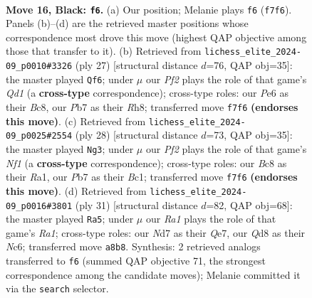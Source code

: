 \documentclass[11pt]{article}
\begin{document}
\clearpage

\begin{figure}[p]\centering
\begin{subfigure}{0.46\textwidth}\centering
\resizebox{\linewidth}{!}{%
\newchessgame
\chessboard[
  setfen={r1bq1rk1/1p1n1ppp/n1p1p3/p2pP3/3P1P2/2N2N2/PPP2KPP/2RQ1B1R b - - 7 16},
  showmover=false,
  pgfstyle=straightmove, color=movearrow, markmove={f7-f6}
]}
\caption{}
\end{subfigure}\hfill
\begin{subfigure}{0.46\textwidth}\centering
\resizebox{\linewidth}{!}{%
\newchessgame
\chessboard[
  setfen={r1bqk2r/pp1n1p2/3p2p1/2pPp2n/2P1P2p/2NN1P2/PP1Q2PP/1K1R1B1R b q - 5 14},
  showmover=false,
  pgfstyle=straightmove, color=movearrow, markmove={d8-f6}
]}
\caption{}
\end{subfigure}
\\[4pt]
\begin{subfigure}{0.46\textwidth}\centering
\resizebox{\linewidth}{!}{%
\newchessgame
\chessboard[
  setfen={1r1q1bk1/2p2pp1/p1nprn1p/1p2p3/P3P3/2PP1N1P/1P3PP1/R1BQRNK1 w - - 0 15},
  showmover=false,
  pgfstyle=straightmove, color=movearrow, markmove={f1-g3}
]}
\caption{}
\end{subfigure}\hfill
\begin{subfigure}{0.46\textwidth}\centering
\resizebox{\linewidth}{!}{%
\newchessgame
\chessboard[
  setfen={r1b2rk1/1p1nqpp1/2n1p2p/2P5/p2pN3/3P1NP1/PPQ2PBP/2R1R1K1 b - - 4 16},
  showmover=false,
  pgfstyle=straightmove, color=movearrow, markmove={a8-a5}
]}
\caption{}
\end{subfigure}
\caption{\textbf{Move 16, Black: \texttt{f6}.} (a) Our position; Melanie plays \texttt{f6} (\texttt{f7f6}). Panels (b)--(d) are the retrieved master positions whose correspondence most drove this move (highest QAP objective among those that transfer to it). (b) Retrieved from \texttt{lichess\_elite\_2024-09\_p0010\#3326} (ply 27) [structural distance $d$=76, QAP obj=35]: the master played \texttt{Qf6}; under $\mu$ our \emph{Pf2} plays the role of that game's \emph{Qd1} (a \textbf{cross-type} correspondence); cross-type roles: our \emph{P}e6 as their \emph{B}c8, our \emph{P}b7 as their \emph{R}h8; transferred move \texttt{f7f6} \textbf{(endorses this move)}. (c) Retrieved from \texttt{lichess\_elite\_2024-09\_p0025\#2554} (ply 28) [structural distance $d$=73, QAP obj=35]: the master played \texttt{Ng3}; under $\mu$ our \emph{Pf2} plays the role of that game's \emph{Nf1} (a \textbf{cross-type} correspondence); cross-type roles: our \emph{B}c8 as their \emph{R}a1, our \emph{P}b7 as their \emph{B}c1; transferred move \texttt{f7f6} \textbf{(endorses this move)}. (d) Retrieved from \texttt{lichess\_elite\_2024-09\_p0016\#3801} (ply 31) [structural distance $d$=82, QAP obj=68]: the master played \texttt{Ra5}; under $\mu$ our \emph{Ra1} plays the role of that game's \emph{Ra1}; cross-type roles: our \emph{N}d7 as their \emph{Q}e7, our \emph{Q}d8 as their \emph{N}c6; transferred move \texttt{a8b8}. Synthesis: 2 retrieved analogs transferred to \texttt{f6} (summed QAP objective 71, the strongest correspondence among the candidate moves); Melanie committed it via the \texttt{search} selector.}
\label{fig:thought-m31}
\end{figure}
\end{document}
